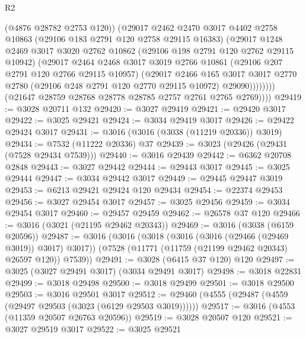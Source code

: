 \begin{lexlean}{R2}
\begin{coremodule}
                    (@4876 @28782 @2753 @120))
                  (@29017
                    @2462
                    @2470
                    @3017
                    @4402
                    @2758
                    @10863
                    (@29106 @183 @2791 @120 @2758 @29115 @16383)
                    (@29017
                      @1248
                      @2469
                      @3017
                      @3020
                      @2762
                      @10862
                      (@29106 @198 @2791 @120 @2762 @29115 @10942)
                      (@29017
                        @2464
                        @2468
                        @3017
                        @3019
                        @2766
                        @10861
                        (@29106 @207 @2791 @120 @2766 @29115 @10957)
                        (@29017
                          @2466
                          @165
                          @3017
                          @3017
                          @2770
                          @2780
                          (@29106 @248 @2791 @120 @2770 @29115 @10972)
                          @29090))))))))
          (@21647 @28759 @28768 @28778 @28785 @2757 @2761 @2765 @2769))))
@29419 := @3028 @20711 @132
@29420 := @3027 @29419
@29421 := @29420 @3017
@29422 := @3025 @29421
@29424 := @3034 @29419 @3017
@29426 := @29422 @29424 @3017
@29431 := @3016 (@3016 (@3038 (@11219 @20336)) @3019)
@29434 := @7532 (@11222 @20336) @37
@29439 := @3023 (@29426 (@29431 (@7528 @29434 @7539)))
@29440 := @3016 @29439
@29442 := @6362 @20708 @2848
@29443 := @3027 @29442
@29444 := @29443 @3017
@29445 := @3025 @29444
@29447 := @3034 @29442 @3017
@29449 := @29445 @29447 @3019
@29453 := @6213 @29421 @29424 @120 @29434
@29454 := @22374 @29453
@29456 := @3027 @29454 @3017
@29457 := @3025 @29456
@29459 := @3034 @29454 @3017
@29460 := @29457 @29459
@29462 := @26578 @37 @120
@29466 := @3016 (@3021 (@21195 @29462 @20343))
@29469 := @3016 (@3038 (@6159 @20596))
@29487 := @3016
    (@3016
      (@3018 (@3016 (@3016 (@29466 (@29469 @3019)) @3017) @3017))
      (@7528 (@11771 (@11759 (@21199 @29462 @20343) @26597 @120)) @7539))
@29491 := @3028 (@6415 @37 @120) @120
@29497 := @3025 (@3027 @29491 @3017) (@3034 @29491 @3017)
@29498 := @3018 @22831
@29499 := @3018 @29498
@29500 := @3018 @29499
@29501 := @3018 @29500
@29503 := @3016 @29501 @3017
@29512 := @29460 (@4555 (@29487 (@4559 (@29497 @29503 (@3023 (@6129 @29503 @3019))))))
@29517 := @3016 (@4553 (@11359 @20507 @26763 @20596))
@29519 := @3028 @20507 @120
@29521 := @3027 @29519 @3017
@29522 := @3025 @29521

\end{coremodule}
\end{lexlean}
